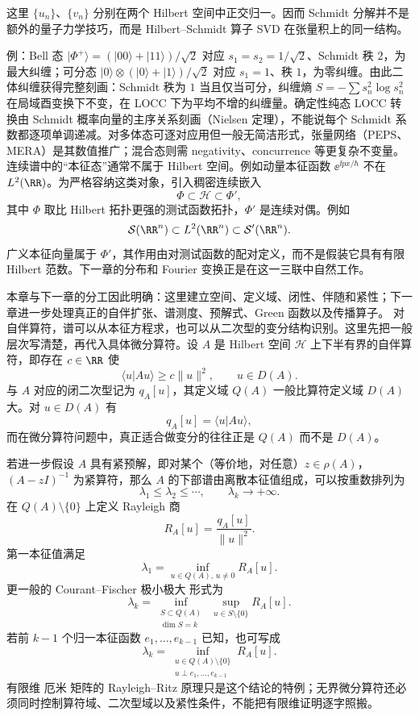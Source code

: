 这里 $\{u_n\}$、$\{v_n\}$ 分别在两个 Hilbert 空间中正交归一。因而 Schmidt 分解并不是额外的量子力学技巧，而是 Hilbert--Schmidt 算子 SVD 在张量积上的同一结构。

例：Bell 态 $|\Phi^+\rangle=(|00\rangle+|11\rangle)/\sqrt2$ 对应 $s_1=s_2=1/\sqrt2$、Schmidt 秩 $2$，为最大纠缠；可分态 $|0\rangle\otimes(|0\rangle+|1\rangle)/\sqrt2$ 对应 $s_1=1$、秩 $1$，为零纠缠。由此二体纠缠获得完整刻画：Schmidt 秩为 $1$ 当且仅当可分，纠缠熵 $S=-\sum s_n^2\log s_n^2$ 在局域酉变换下不变，在 LOCC 下为平均不增的纠缠量。确定性纯态 LOCC 转换由 Schmidt 概率向量的主序关系刻画（Nielsen 定理），不能说每个 Schmidt 系数都逐项单调递减。对多体态可逐对应用但一般无简洁形式，张量网络（PEPS、MERA）是其数值推广；混合态则需 negativity、concurrence 等更复杂不变量。
连续谱中的“本征态”通常不属于 Hilbert 空间。例如动量本征函数 $\ee^{\ii px/\hbar}$ 不在 $L^2(\RR)$。为严格容纳这类对象，引入稠密连续嵌入
\[
{\Phi\subset\mathcal H\subset\Phi'},
\]
其中 $\Phi$ 取比 Hilbert 拓扑更强的测试函数拓扑，$\Phi'$ 是连续对偶。例如
\[
\mathcal S(\RR^n)
\subset L^2(\RR^n)
\subset\mathcal S'(\RR^n).
\]
广义本征向量属于 $\Phi'$，其作用由对测试函数的配对定义，而不是假装它具有有限 Hilbert 范数。下一章的分布和 Fourier 变换正是在这一三联中自然工作。

本章与下一章的分工因此明确：这里建立空间、定义域、闭性、伴随和紧性；下一章进一步处理真正的自伴扩张、谱测度、预解式、Green 函数以及传播算子。
对自伴算符，谱可以从本征方程求，也可以从二次型的变分结构识别。这里先把一般层次写清楚，再代入具体微分算符。设 $A$ 是 Hilbert 空间 $\mathcal H$ 上下半有界的自伴算符，即存在 $c\in\RR$ 使
\[
\langle u|Au\rangle\ge c\|u\|^2,
\qquad u\in D(A).
\]
与 $A$ 对应的闭二次型记为 $q_A[u]$，其定义域 $Q(A)$ 一般比算符定义域 $D(A)$ 大。对 $u\in D(A)$ 有
\[
q_A[u]=\langle u|Au\rangle,
\]
而在微分算符问题中，真正适合做变分的往往正是 $Q(A)$ 而不是 $D(A)$。

若进一步假设 $A$ 具有紧预解，即对某个（等价地，对任意）$z\in\rho(A)$，$(A-zI)^{-1}$ 为紧算符，那么 $A$ 的下部谱由离散本征值组成，可以按重数排列为
\[
\lambda_1\le\lambda_2\le\cdots,
\qquad \lambda_k\to+\infty.
\]
在 $Q(A)\setminus\{0\}$ 上定义 Rayleigh 商
\[
R_A[u]=\frac{q_A[u]}{\|u\|^2}.
\]
第一本征值满足
\begin{equation}
{
\lambda_1=\inf_{u\in Q(A),\,u\ne0}R_A[u]
}.
\label{eq:rayleigh-ritz-first}
\end{equation}
更一般的 Courant--Fischer 极小极大 形式为
\begin{equation}
{
\lambda_k=
\inf_{\substack{S\subset Q(A)\\ \dim S=k}}
\ \sup_{u\in S\setminus\{0\}}R_A[u]
}.
\label{eq:courant-fischer-form}
\end{equation}
若前 $k-1$ 个归一本征函数 $e_1,\ldots,e_{k-1}$ 已知，也可写成
\[
\lambda_k=
\inf_{\substack{u\in Q(A)\setminus\{0\}\\u\perp e_1,\ldots,e_{k-1}}}
R_A[u].
\]
有限维 厄米 矩阵的 Rayleigh--Ritz 原理只是这个结论的特例；无界微分算符还必须同时控制算符域、二次型域以及紧性条件，不能把有限维证明逐字照搬。

